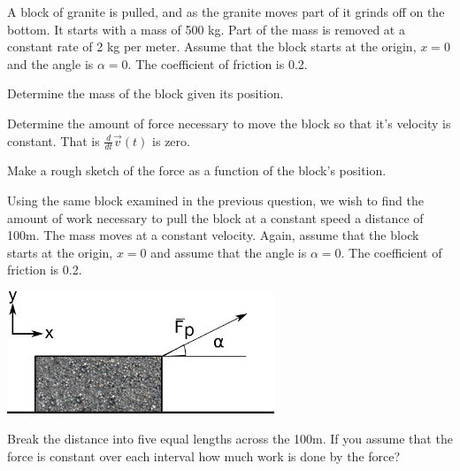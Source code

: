 \begin{problem}
\item A block of granite is pulled, and as the granite moves part of
  it grinds off on the bottom. It starts with a mass of 500 kg. Part
  of the mass is removed at a constant rate of 2 kg per meter. Assume
  that the block starts at the origin, $x=0$ and the angle is
  $\alpha=0$. The coefficient of friction is 0.2.

  \begin{subproblem}
  \item Determine the mass of the block given its position.
    \vfill
  \item Determine the amount of force necessary to move the block so
    that it's velocity is constant. That is
    $\frac{d}{dt} \vec{v}(t)$ is zero.
    \vfill
  \item Make a rough sketch of the force as a function of the block's
    position.  

    \vfill
  \end{subproblem}

\clearpage

\item Using the same block examined in the previous question, we wish
  to find the amount of work necessary to pull the block at a constant
  speed a distance of 100m. The mass moves at a constant
  velocity. Again, assume that the block starts at the origin, $x=0$
  and assume that the angle is $\alpha=0$. The coefficient of friction
  is 0.2.

  \includegraphics[width=8cm]{ink/week7/dragBlock}

  \begin{subproblem}
  \item Break the distance into five equal lengths across the 100m.
    If you assume that the force is constant over each interval how
    much work is done by the force?  

    \vfill


\end{subproblem}
\end{problem}
